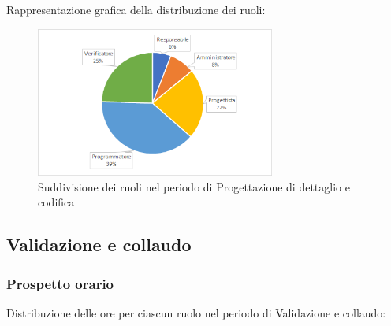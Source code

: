 		Rappresentazione grafica della distribuzione dei ruoli:
		\begin{figure}[h]
			\centering
			\includegraphics[width=0.7\textwidth]{./res/img/progettazioneDettaglioCodifica_pe.png}
			\caption{Suddivisione dei ruoli nel periodo di Progettazione di dettaglio e codifica}
		\end{figure}

\newpage
\subsection{Validazione e collaudo}
	\subsubsection{Prospetto orario}
	Distribuzione delle ore per ciascun ruolo nel periodo di Validazione e collaudo:

